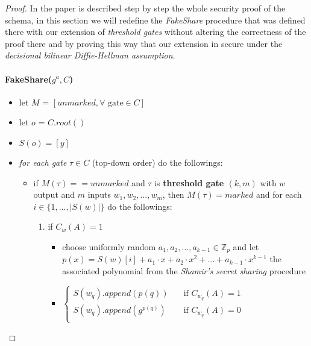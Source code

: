 \documentclass[12pt]{article}
\begin{document}
\begin{proof}

In the \cite{fltccd} paper is described step by step the whole security proof of the schema, in this section we will redefine the \textit{FakeShare} procedure that was defined there with our extension of \textit{threshold gates} without altering the correctness of the proof there and by proving this way that our extension in secure under the \textit{decisional bilinear Diffie-Hellman assumption}.

\paragraph{FakeShare($g^a, C$)}
\begin{itemize}
    \item let $M$ = $[unmarked, \forall \textrm{ gate} \in C]$
	\item let $o$ = $C.root()$
	\item $S(o) = [y] $
	\item \textit{for each gate} $\tau \in C$ (top-down order) do the followings:
    	\begin{itemize}
    	    \item if $M(\tau) == unmarked$ and $\tau$ is \textbf{threshold gate $(k, m)$} with $w$ output and $m$ inputs $w_1, w_2, ..., w_m$, then $M(\tau) = marked$ and for each $i \in \{1, ...,|S(w)|\}$ do the followings:
    	        \begin{enumerate}
    	            \item if $C_w(A) = 1$
    	            \begin{itemize}
    	                \item choose uniformly random $a_1, a_2, ..., a_{k - 1} \in \mathbb{Z}_p$ and let $p(x) = S(w)[i] + a_1 \cdot x + a_2 \cdot x^2 + ... + a_{k-1} \cdot x^{k - 1}$ the associated polynomial from the \textit{Shamir's secret sharing} procedure
    	            \item
                     $\begin{cases}
                       S(w_q).append(p(q)) &\quad\text{if } C_{w_q}(A) = 1\\
                       S(w_q).append(g^{p(q)}) &\quad \text{if } C_{w_q}(A) = 0 \\
                     \end{cases}$
    	            \end{itemize}
    	            

\end{enumerate}
\end{itemize}
\end{itemize}
\end{proof}
\end{document}
